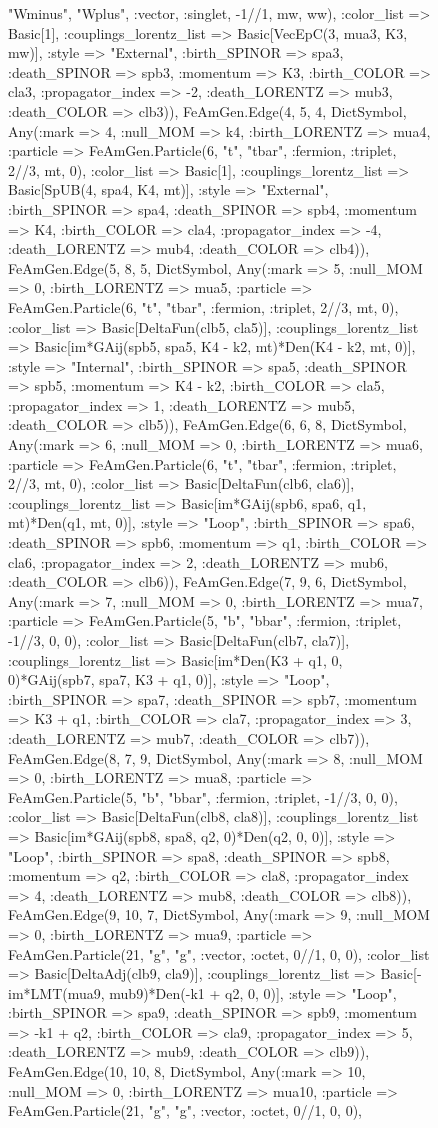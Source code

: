\documentclass{revtex4}
\begin{document}
\begin{figure}[!htb]
\begin{center}
{"Wminus", "Wplus", :vector, :singlet, -1//1, mw, ww), :color_list => Basic[1], :couplings_lorentz_list => Basic[VecEpC(3, mua3, K3, mw)], :style => "External", :birth_SPINOR => spa3, :death_SPINOR => spb3, :momentum => K3, :birth_COLOR => cla3, :propagator_index => -2, :death_LORENTZ => mub3, :death_COLOR => clb3)), FeAmGen.Edge(4, 5, 4, Dict{Symbol, Any}(:mark => 4, :null_MOM => k4, :birth_LORENTZ => mua4, :particle => FeAmGen.Particle(6, "t", "tbar", :fermion, :triplet, 2//3, mt, 0), :color_list => Basic[1], :couplings_lorentz_list => Basic[SpUB(4, spa4, K4, mt)], :style => "External", :birth_SPINOR => spa4, :death_SPINOR => spb4, :momentum => K4, :birth_COLOR => cla4, :propagator_index => -4, :death_LORENTZ => mub4, :death_COLOR => clb4)), FeAmGen.Edge(5, 8, 5, Dict{Symbol, Any}(:mark => 5, :null_MOM => 0, :birth_LORENTZ => mua5, :particle => FeAmGen.Particle(6, "t", "tbar", :fermion, :triplet, 2//3, mt, 0), :color_list => Basic[DeltaFun(clb5, cla5)], :couplings_lorentz_list => Basic[im*GAij(spb5, spa5, K4 - k2, mt)*Den(K4 - k2, mt, 0)], :style => "Internal", :birth_SPINOR => spa5, :death_SPINOR => spb5, :momentum => K4 - k2, :birth_COLOR => cla5, :propagator_index => 1, :death_LORENTZ => mub5, :death_COLOR => clb5)), FeAmGen.Edge(6, 6, 8, Dict{Symbol, Any}(:mark => 6, :null_MOM => 0, :birth_LORENTZ => mua6, :particle => FeAmGen.Particle(6, "t", "tbar", :fermion, :triplet, 2//3, mt, 0), :color_list => Basic[DeltaFun(clb6, cla6)], :couplings_lorentz_list => Basic[im*GAij(spb6, spa6, q1, mt)*Den(q1, mt, 0)], :style => "Loop", :birth_SPINOR => spa6, :death_SPINOR => spb6, :momentum => q1, :birth_COLOR => cla6, :propagator_index => 2, :death_LORENTZ => mub6, :death_COLOR => clb6)), FeAmGen.Edge(7, 9, 6, Dict{Symbol, Any}(:mark => 7, :null_MOM => 0, :birth_LORENTZ => mua7, :particle => FeAmGen.Particle(5, "b", "bbar", :fermion, :triplet, -1//3, 0, 0), :color_list => Basic[DeltaFun(clb7, cla7)], :couplings_lorentz_list => Basic[im*Den(K3 + q1, 0, 0)*GAij(spb7, spa7, K3 + q1, 0)], :style => "Loop", :birth_SPINOR => spa7, :death_SPINOR => spb7, :momentum => K3 + q1, :birth_COLOR => cla7, :propagator_index => 3, :death_LORENTZ => mub7, :death_COLOR => clb7)), FeAmGen.Edge(8, 7, 9, Dict{Symbol, Any}(:mark => 8, :null_MOM => 0, :birth_LORENTZ => mua8, :particle => FeAmGen.Particle(5, "b", "bbar", :fermion, :triplet, -1//3, 0, 0), :color_list => Basic[DeltaFun(clb8, cla8)], :couplings_lorentz_list => Basic[im*GAij(spb8, spa8, q2, 0)*Den(q2, 0, 0)], :style => "Loop", :birth_SPINOR => spa8, :death_SPINOR => spb8, :momentum => q2, :birth_COLOR => cla8, :propagator_index => 4, :death_LORENTZ => mub8, :death_COLOR => clb8)), FeAmGen.Edge(9, 10, 7, Dict{Symbol, Any}(:mark => 9, :null_MOM => 0, :birth_LORENTZ => mua9, :particle => FeAmGen.Particle(21, "g", "g", :vector, :octet, 0//1, 0, 0), :color_list => Basic[DeltaAdj(clb9, cla9)], :couplings_lorentz_list => Basic[-im*LMT(mua9, mub9)*Den(-k1 + q2, 0, 0)], :style => "Loop", :birth_SPINOR => spa9, :death_SPINOR => spb9, :momentum => -k1 + q2, :birth_COLOR => cla9, :propagator_index => 5, :death_LORENTZ => mub9, :death_COLOR => clb9)), FeAmGen.Edge(10, 10, 8, Dict{Symbol, Any}(:mark => 10, :null_MOM => 0, :birth_LORENTZ => mua10, :particle => FeAmGen.Particle(21, "g", "g", :vector, :octet, 0//1, 0, 0), }
\end{center}
\end{figure}
\end{document}
